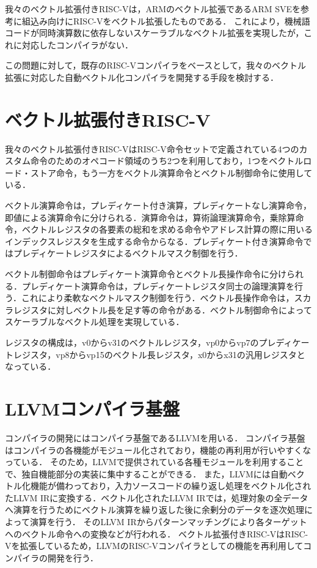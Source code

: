 \documentclass[a4paper,9pt, twocolumn]{jarticle}
\begin{document}
我々のベクトル拡張付きRISC-Vは，ARMのベクトル拡張であるARM SVE\cite{bib:arm_sve}を参考に組込み向けにRISC-V\cite{bib:risc-v}をベクトル拡張したものである．
これにより，機械語コードが同時演算数に依存しないスケーラブルなベクトル拡張を実現したが，これに対応したコンパイラがない．

この問題に対して，既存のRISC-Vコンパイラをベースとして，我々のベクトル拡張に対応した自動ベクトル化コンパイラを開発する手段を検討する．


\section{ベクトル拡張付きRISC-V}

我々のベクトル拡張付きRISC-VはRISC-V命令セットで定義されている4つのカスタム命令のためのオペコード領域のうち2つを利用しており，1つをベクトルロード・ストア命令，もう一方をベクトル演算命令とベクトル制御命令に使用している．

ベクトル演算命令は，プレディケート付き演算，プレディケートなし演算命令，即値による演算命令に分けられる．演算命令は，算術論理演算命令，乗除算命令，ベクトルレジスタの各要素の総和を求める命令やアドレス計算の際に用いるインデックスレジスタを生成する命令からなる．プレディケート付き演算命令ではプレディケートレジスタによるベクトルマスク制御を行う．

ベクトル制御命令はプレディケート演算命令とベクトル長操作命令に分けられる．プレディケート演算命令は，プレディケートレジスタ同士の論理演算を行う．これにより柔軟なベクトルマスク制御を行う．ベクトル長操作命令は，スカラレジスタに対しベクトル長を足す等の命令がある．ベクトル制御命令によってスケーラブルなベクトル処理を実現している．

レジスタの構成は，v0からv31のベクトルレジスタ，vp0からvp7のプレディケートレジスタ，vp8からvp15のベクトル長レジスタ，x0からx31の汎用レジスタとなっている．

\section{LLVMコンパイラ基盤}
コンパイラの開発にはコンパイラ基盤であるLLVM\cite{bib:llvm}を用いる．
コンパイラ基盤はコンパイラの各機能がモジュール化されており，機能の再利用が行いやすくなっている．
そのため，LLVMで提供されている各種モジュールを利用することで、独自機能部分の実装に集中することができる．
また，LLVMには自動ベクトル化機能が備わっており，入力ソースコードの繰り返し処理をベクトル化されたLLVM IRに変換する．ベクトル化されたLLVM IRでは，処理対象の全データへ演算を行うためにベクトル演算を繰り返した後に余剰分のデータを逐次処理によって演算を行う．
そのLLVM IRからパターンマッチングにより各ターゲットへのベクトル命令への変換などが行われる．
ベクトル拡張付きRISC-VはRISC-Vを拡張しているため，LLVMのRISC-Vコンパイラとしての機能を再利用してコンパイラの開発を行う．
\end{document}
